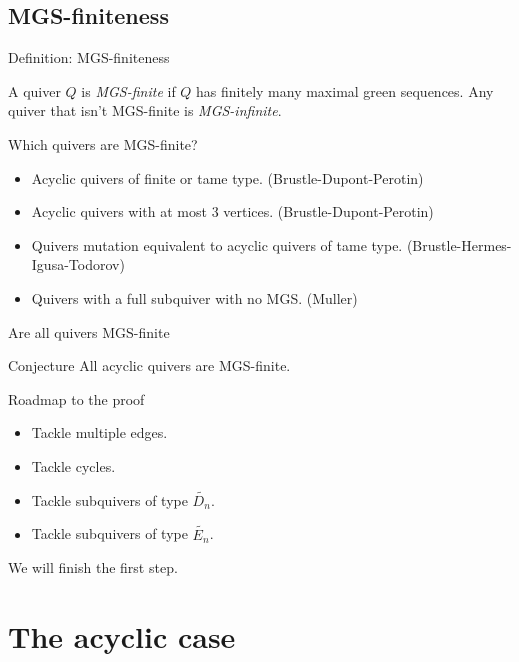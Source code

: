 \documentclass{beamer}
\begin{document}
\subsection{MGS-finiteness}
\begin{frame}{Definition: MGS-finiteness}
\begin{definition}
A quiver $Q$ is \textit{MGS-finite} if $Q$ has finitely many maximal green sequences. Any quiver that isn't MGS-finite is \textit{MGS-infinite}.
\end{definition}
\end{frame}

\begin{frame}{Which quivers are MGS-finite?}
\begin{itemize}
\item Acyclic quivers of finite or tame type. (Brustle-Dupont-Perotin) \cite{BDP13}\pause
\item Acyclic quivers with at most 3 vertices. (Brustle-Dupont-Perotin) \cite{BDP13}\pause
\item Quivers mutation equivalent to acyclic quivers of tame type. (Brustle-Hermes-Igusa-Todorov) \cite{BHIT15}\pause
\item Quivers with a full subquiver with no MGS. (Muller)\cite{Mul15}
\end{itemize}
\end{frame}

\begin{frame}{Are all quivers MGS-finite}
\begin{block}{Conjecture}
All acyclic quivers are MGS-finite.
\end{block}
\end{frame}

\begin{frame}{Roadmap to the proof}
\begin{itemize}
\item Tackle multiple edges.\pause
\item Tackle cycles.\pause
\item Tackle subquivers of type $\tilde{D_n}$.\pause
\item Tackle subquivers of type $\tilde{E_n}$.\pause
\end{itemize}
\indent We will finish the first step.
\end{frame}

\section{The acyclic case}
\end{document}
